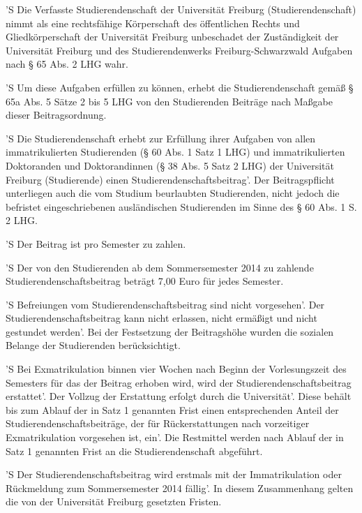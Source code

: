 \documentclass[fontsize=12pt,parskip=half]{scrartcl}
\begin{document}
\begin{contract}
  'S Die Verfasste Studierendenschaft der Universität Freiburg
  (Studierendenschaft) nimmt als eine rechtsfähige Körperschaft des öffentlichen
  Rechts und Gliedkörperschaft der Universität Freiburg unbeschadet der
  Zuständigkeit der Universität Freiburg und des Studierendenwerks
  Freiburg-Schwarzwald Aufgaben nach § 65 Abs. 2 LHG wahr. 

  'S Um diese Aufgaben erfüllen zu können, erhebt die Studierendenschaft gemäß §
  65a Abs. 5 Sätze 2 bis 5 LHG von den Studierenden Beiträge nach Maßgabe dieser
  Beitragsordnung.

  'S Die Studierendenschaft erhebt zur Erfüllung ihrer Aufgaben von allen
  immatrikulierten Studierenden (§ 60 Abs. 1 Satz 1 LHG) und immatrikulierten
  Doktoranden und Doktorandinnen (§ 38 Abs. 5 Satz 2 LHG) der Universität
  Freiburg (Studierende) einen Studierendenschaftsbeitrag'. Der Beitragspflicht
  unterliegen auch die vom Studium beurlaubten Studierenden, nicht jedoch die
  befristet eingeschriebenen ausländischen Studierenden im Sinne des § 60 Abs. 1
  S. 2 LHG.

  'S Der Beitrag ist pro Semester zu zahlen.

  'S Der von den Studierenden ab dem Sommersemester 2014 zu zahlende
  Studierendenschaftsbeitrag beträgt 7,00 Euro für jedes Semester.

  'S Befreiungen vom Studierendenschaftsbeitrag sind nicht vorgesehen'. Der
  Studierendenschaftsbeitrag kann nicht erlassen, nicht ermäßigt und nicht
  gestundet werden'. Bei der Festsetzung der Beitragshöhe wurden die sozialen
  Belange der Studierenden berücksichtigt.

  'S Bei Exmatrikulation binnen vier Wochen nach Beginn der Vorlesungszeit des
  Semesters für das der Beitrag erhoben wird, wird der
  Studierendenschaftsbeitrag erstattet'. Der Vollzug der Erstattung erfolgt
  durch die Universität'. Diese behält bis zum Ablauf der in Satz 1 genannten
  Frist einen entsprechenden Anteil der Studierendenschaftsbeiträge, der für
  Rückerstattungen nach vorzeitiger Exmatrikulation vorgesehen ist, ein'. Die
  Restmittel werden nach Ablauf der in Satz 1 genannten Frist an die
  Studierendenschaft abgeführt.

  'S Der Studierendenschaftsbeitrag wird erstmals mit der Immatrikulation oder
  Rückmeldung zum Sommersemester 2014 fällig'. In diesem Zusammenhang gelten die
  von der Universität Freiburg gesetzten Fristen.


\end{contract}
\end{document}
